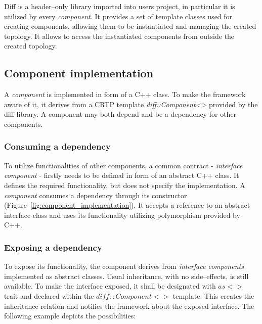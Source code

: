 \documentclass[preprint,12pt, a4paper]{elsarticle}
\begin{document}



Diff is a header--only library imported into users project, in particular it is utilized by every \textit{component}. It provides a set of template classes used for creating components, allowing them to be instantiated and managing the created topology. It allows to access the instantiated components from outside the created topology.

\subsection{Component implementation}
A \textit{component} is implemented in form of a C++ class. To make the framework aware of it, it derives from a CRTP template \textit{diff::Component<>} provided by the diff library. A component may both depend and be a dependency for other components.

\subsubsection{Consuming a dependency}
To utilize functionalities of other components, a common contract - \textit{interface component} - firstly needs to be defined in form of an abstract C++ class. It defines the required functionality, but does not specify the implementation. A \textit{component} consumes a dependency through its constructor (Figure~\ref{fig:component_implementation}). It accepts a reference to an abstract interface class and uses its functionality utilizing polymorphism provided by C++.

\subsubsection{Exposing a dependency}
To expose its functionality, the component derives from \textit{interface components} implemented as abstract classes. Usual inheritance, with no side--effects, is still available. To make the interface exposed, it shall be designated with $as<>$ trait and declared within the $diff::Component<>$ template. This creates the inheritance relation and notifies the framework about the exposed interface. The following example depicts the possibilities:
\end{document}
